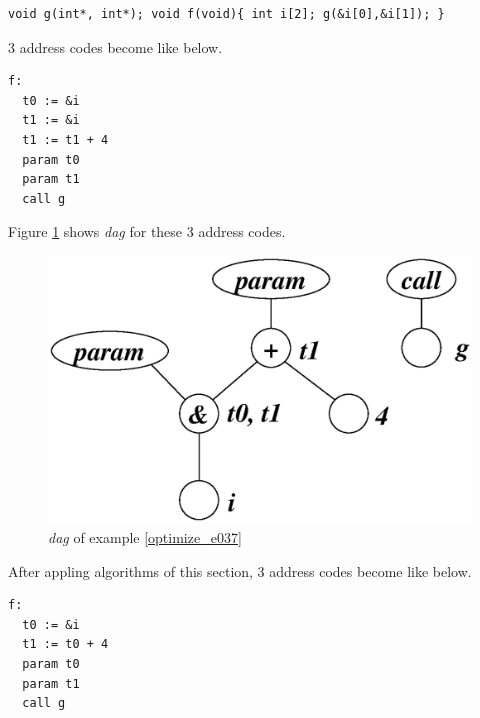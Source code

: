 \begin{Example}
\label{optimize_e037}
\begin{verbatim}
void g(int*, int*); void f(void){ int i[2]; g(&i[0],&i[1]); }
\end{verbatim}
3 address codes become like below.
\begin{verbatim}
f:
  t0 := &i
  t1 := &i
  t1 := t1 + 4
  param t0
  param t1
  call g
\end{verbatim}
Figure \ref{optimize_e038} shows {\em dag} for these 3 address codes.
\begin{figure}[htbp]
\begin{center}
\includegraphics[width=1.0\linewidth,height=0.623\linewidth]{opt020.eps}
\caption{{\em dag} of example \ref{optimize_e037}}
\label{optimize_e038}
\end{center}
\end{figure}
After appling algorithms of this section,
3 address codes become like below.
\begin{verbatim}
f:
  t0 := &i
  t1 := t0 + 4
  param t0
  param t1
  call g
\end{verbatim}
\end{Example}


